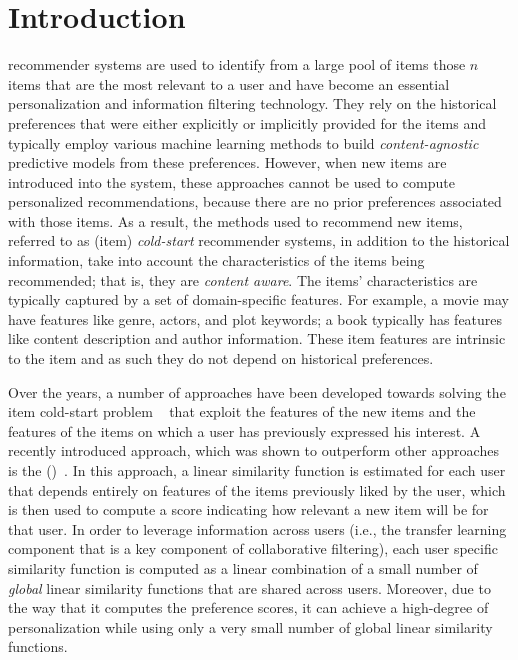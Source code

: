 \section{Introduction} \label{ch:bilinear:introduction}

\TOPN recommender systems are used to identify from a large pool of items those $n$
items that are the most relevant to a user and have become an essential
personalization and information filtering technology. They rely on the historical
preferences that were either explicitly or implicitly provided for the items and
typically employ various machine learning methods to build \emph{content-agnostic}
predictive models from these preferences. However, when new items are introduced into
the system, these approaches cannot be used to compute personalized recommendations,
because there are no prior preferences associated with those items.
%
As a result, the methods used to recommend new items, referred to as (item)
\emph{cold-start} recommender systems, in addition to the historical information,
take into account the characteristics of the items being recommended; that is, they
are \emph{content aware}. The items' characteristics are typically captured by a set
of domain-specific features. For example, a movie may have features like genre,
actors, and plot keywords; a book typically has features like content description and
author information. These item features are intrinsic to the item and as such they do
not depend on historical preferences. 

Over the years, a number of approaches have been developed towards solving the
item cold-start problem ~\cite{r1,agarwal09,r10} that exploit the
features of the new items and the features of
the items on which a user has previously expressed his interest. A recently introduced approach, which
was shown to outperform other approaches is the \CFLINEXP (\CFLIN)~\cite{r42}.
In this approach, a linear similarity function is estimated for each user that
depends entirely on features of the items previously liked by the user, which is
then used to compute a score indicating how relevant a new item will be for that
user. In order to leverage information across users (i.e., the transfer learning
component that is a key component of collaborative filtering), each user
specific similarity function is computed as a linear combination of a small
number of \emph{global} linear similarity functions that are shared across
users. Moreover, due to the way that it computes the preference scores, it can
achieve a high-degree of personalization while using only a very small number of
global linear similarity functions.



